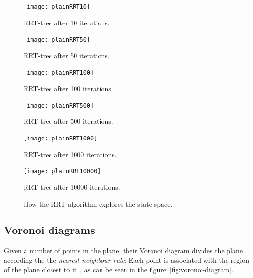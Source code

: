\begin{figure}
  \centering
  \begin{minipage}[b]{0.3\textwidth}
    \texttt{[image: plainRRT10]}
    \caption{RRT-tree after 10 iterations.}
  \end{minipage}
  \begin{minipage}[b]{0.3\textwidth}
    \texttt{[image: plainRRT50]}
    \caption{RRT-tree after 50 iterations.}
  \end{minipage}
  \begin{minipage}[b]{0.3\textwidth}
    \texttt{[image: plainRRT100]}
    \caption{RRT-tree after 100 iterations.}
  \end{minipage}
  \newline %
  \begin{minipage}[b]{0.3\textwidth}
    \texttt{[image: plainRRT500]}
    \caption{RRT-tree after 500 iterations.}
  \end{minipage}
  \begin{minipage}[b]{0.3\textwidth}
    \texttt{[image: plainRRT1000]}
    \caption{RRT-tree after 1000 iterations.}
  \end{minipage}
  \begin{minipage}[b]{0.3\textwidth}
    \texttt{[image: plainRRT10000]}
    \caption{RRT-tree after 10000 iterations.}
  \end{minipage}
  \caption{How the \ac{RRT} algorithm explores the state space.}
  \label{fig:rrt-expansion}
\end{figure}

\subsection{Voronoi diagrams}
\label{subsec:voronoi regions}

Given a number of points in the plane, their Voronoi diagram divides the plane
according the the \textit{nearest neighbour rule}: Each point is associated with
the region of the plane closest to
it~\cite{aurenhammerVoronoiDiagramsSurvey1991}, as can be seen in the
figure~\ref{fig:voronoi-diagram}.

